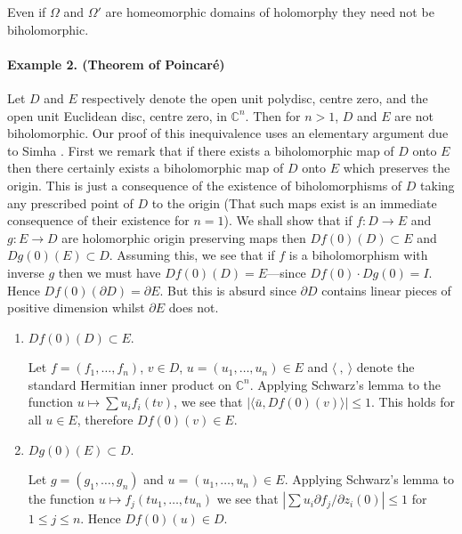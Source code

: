Even if $\Omega$ and $\Omega'$ are homeomorphic domains of holomorphy they need not be biholomorphic.

\paragraph*{Example 2. (Theorem of Poincar\'e)} Let $D$ and $E$ respectively denote the open unit polydisc, centre zero, and the open unit Euclidean disc, centre zero, in $\mathbb C^n$. Then for $n>1$, $D$ and $E$ are not biholomorphic. Our proof of this inequivalence uses an elementary argument due to Simha \cite{bib:I:simha-r-r:1}. First we remark that if there exists a biholomorphic map of $D$ onto $E$ then there certainly exists a biholomorphic map of $D$ onto $E$ which preserves the origin. This is just a consequence of the existence of biholomorphisms of $D$ taking any prescribed point of $D$ to the origin (That such maps exist is an immediate consequence of their existence for $n=1$). We shall show that if $f:D\longrightarrow E$ and $g:E\longrightarrow D$ are holomorphic origin preserving maps then $Df(0)(D)\subset E$ and $Dg(0)(E)\subset D$. Assuming this, we see that if $f$ is a biholomorphism with inverse $g$ then we must have $Df(0)(D)=E$---since $Df(0)\cdot Dg(0)=I$. Hence $Df(0)(\partial D)=\partial E$. But this is absurd since $\partial D$ contains linear pieces of positive dimension whilst $\partial E$ does not.
\begin{enumerate}
\item $Df(0)(D)\subset E$.

Let $f=(f_1,\ldots,f_n)$, $v\in D$, $u=(u_1,\ldots,u_n)\in E$ and $\langle\ ,\ \rangle$ denote the standard Hermitian inner product on $\mathbb C^n$. Applying Schwarz's lemma to the function $u\longmapsto\sum u_i f_i(tv)$, we see that $|\langle\bar u,Df(0)(v)\rangle|\leq1$. This holds for all $u\in E$, therefore $Df(0)(v)\in E$.
\item $Dg(0)(E)\subset D$.

Let $g=(g_1,\ldots,g_n)$ and $u=(u_1,\ldots,u_n)\in E$. Applying Schwarz's lemma to the function $u\longmapsto f_j(tu_1,\ldots,tu_n)$ we see that $|\sum u_i\partial f_j/\partial z_i(0)|\leq1$ for $1\leq j\leq n$. Hence $Df(0)(u)\in D$.
\end{enumerate}

